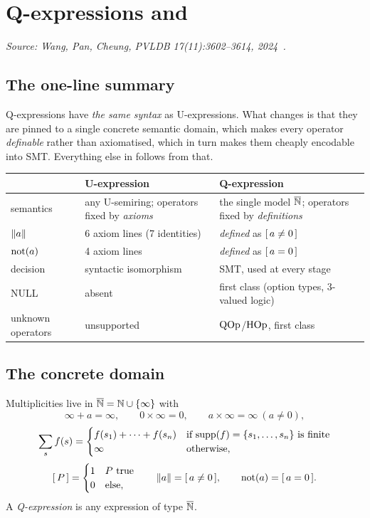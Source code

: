\section{Q-expressions and \QED{}}
\label{sec:qexpr}

\emph{Source: Wang, Pan, Cheung, PVLDB 17(11):3602--3614, 2024~\cite{qed}.}

\subsection{The one-line summary}

Q-expressions have \emph{the same syntax} as U-expressions. What changes is that they are
pinned to a single concrete semantic domain, which makes every operator \emph{definable}
rather than axiomatised, which in turn makes them cheaply encodable into SMT. Everything
else in \QED{} follows from that.

\begin{table}[h]\centering\small
\begin{tabularx}{\linewidth}{@{}lXX@{}}
\toprule
 & \textbf{U-expression} & \textbf{Q-expression}\\
\midrule
semantics & any U-semiring; operators fixed by \emph{axioms} & the single model $\overline{\mathbb{N}}$; operators fixed by \emph{definitions}\\
$\left\lVert a \right\rVert$ & 6 axiom lines (7 identities) & \emph{defined} as $[\,a\neq0\,]$\\
$\mathrm{not}(a)$ & 4 axiom lines & \emph{defined} as $[\,a=0\,]$\\
decision & syntactic isomorphism & SMT, used at every stage\\
NULL & absent & first class (option types, 3-valued logic)\\
unknown operators & unsupported & $\mathrm{QOp}$/$\mathrm{HOp}$, first class\\
\bottomrule
\end{tabularx}
\end{table}

\subsection{The concrete domain}

\begin{definition}\label{def:nbar}
Multiplicities live in $\overline{\mathbb{N}}=\mathbb{N}\cup\{\infty\}$ with
\[
\infty+a=\infty,\qquad 0\times\infty=0,\qquad a\times\infty=\infty\ (a\neq0),
\]
\[
\sum_{s} f(s)=\begin{cases} f(s_1)+\cdots+f(s_n) & \text{if } \mathrm{supp}(f)=\{s_1,\dots,s_n\}\text{ is finite}\\ \infty & \text{otherwise,}\end{cases}
\]
\[
[\,P\,]=\begin{cases}1&P\text{ true}\\0&\text{else,}\end{cases}
\qquad \left\lVert a \right\rVert=[\,a\neq0\,],\qquad \mathrm{not}(a)=[\,a=0\,].
\]
A \emph{Q-expression} is any expression of type $\overline{\mathbb{N}}$.
\end{definition}

